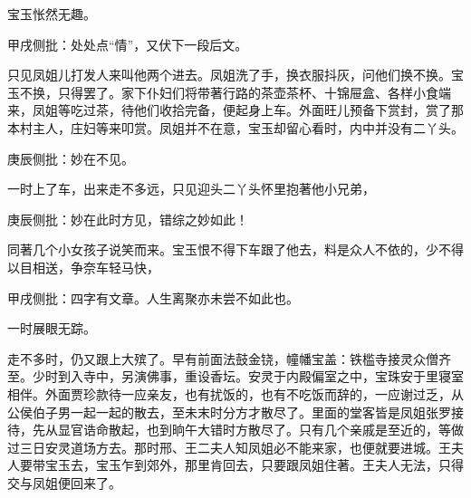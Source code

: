 \begin{parag}
    宝玉怅然无趣。\begin{note}甲戌侧批：处处点“情”，又伏下一段后文。\end{note}只见凤姐儿打发人来叫他两个进去。凤姐洗了手，换衣服抖灰，问他们换不换。宝玉不换，只得罢了。家下仆妇们将带著行路的茶壶茶杯、十锦屉盒、各样小食端来，凤姐等吃过茶，待他们收拾完备，便起身上车。外面旺儿预备下赏封，赏了那本村主人，庄妇等来叩赏。凤姐并不在意，宝玉却留心看时，内中并没有二丫头。\begin{note}庚辰侧批：妙在不见。\end{note}一时上了车，出来走不多远，只见迎头二丫头怀里抱著他小兄弟，\begin{note}庚辰侧批：妙在此时方见，错综之妙如此！\end{note}同著几个小女孩子说笑而来。宝玉恨不得下车跟了他去，料是众人不依的，少不得以目相送，争奈车轻马快，\begin{note}甲戌侧批：四字有文章。人生离聚亦未尝不如此也。\end{note}一时展眼无踪。
\end{parag}


\begin{parag}
    走不多时，仍又跟上大殡了。早有前面法鼓金铙，幢幡宝盖：铁槛寺接灵众僧齐至。少时到入寺中，另演佛事，重设香坛。安灵于内殿偏室之中，宝珠安于里寝室相伴。外面贾珍款待一应亲友，也有扰饭的，也有不吃饭而辞的，一应谢过乏，从公侯伯子男一起一起的散去，至未末时分方才散尽了。里面的堂客皆是凤姐张罗接待，先从显官诰命散起，也到晌午大错时方散尽了。只有几个亲戚是至近的，等做过三日安灵道场方去。那时邢、王二夫人知凤姐必不能来家，也便就要进城。王夫人要带宝玉去，宝玉乍到郊外，那里肯回去，只要跟凤姐住著。王夫人无法，只得交与凤姐便回来了。
\end{parag}


